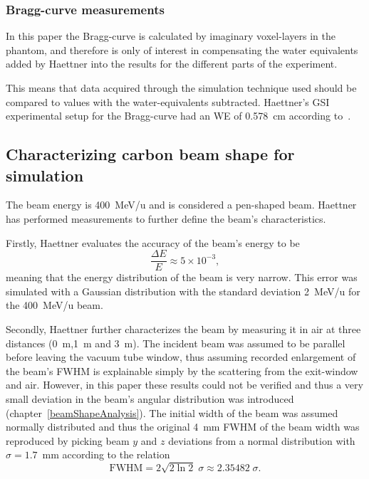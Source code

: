 \subsubsection{Bragg-curve measurements}
In this paper the Bragg-curve is calculated by imaginary voxel-layers in the phantom, and therefore is only of interest in compensating the water equivalents added by Haettner into the results for the different parts of the experiment.

This means that data acquired through the simulation technique used should be compared to values with the water-equivalents subtracted. Haettner's GSI experimental setup for the Bragg-curve had an WE of 0.578~cm according to~\cite[table 4.1]{ehaettner}.




\subsection{Characterizing carbon beam shape for simulation}


The beam energy is 400~MeV/u and is considered a pen-shaped beam. Haettner has performed measurements to further define the beam's characteristics.

Firstly, Haettner evaluates the accuracy of the beam's energy to be \begin{equation}\frac{\Delta E}{E}\approx5\times10^{-3},\end{equation}meaning that the energy distribution of the beam is very narrow. This error was simulated with a Gaussian distribution with the standard deviation 2~MeV/u for the 400~MeV/u beam.

Secondly, Haettner further characterizes the beam by measuring it in air at three distances (0~m,1~m and 3~m). The incident beam was assumed to be parallel before leaving the vacuum tube window, thus assuming recorded enlargement of the beam's FWHM is explainable simply by the scattering from the exit-window and air. However, in this paper these results could not be verified and thus a very small deviation in the beam's angular distribution was introduced (chapter~\ref{beamShapeAnalysis}). The initial width of the beam was assumed normally distributed and thus the original 4~mm FWHM of the beam width was reproduced by picking beam $y$ and $z$ deviations from a normal distribution with $\sigma = 1.7$~mm according to the relation \begin{equation}\mathrm{FWHM} =   2 \sqrt{2 \ln 2 } \; \sigma \approx 2.35482 \; \sigma.\end{equation}

